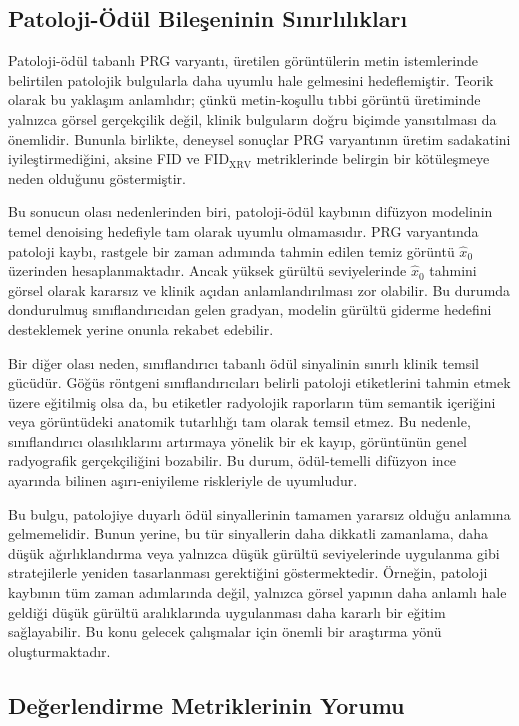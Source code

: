 \documentclass[11pt]{article}
\begin{document}
\subsection{Patoloji-Ödül Bileşeninin Sınırlılıkları}

Patoloji-ödül tabanlı PRG varyantı, üretilen görüntülerin metin istemlerinde
belirtilen patolojik bulgularla daha uyumlu hale gelmesini hedeflemiştir.
Teorik olarak bu yaklaşım anlamlıdır; çünkü metin-koşullu tıbbi görüntü
üretiminde yalnızca görsel gerçekçilik değil, klinik bulguların doğru biçimde
yansıtılması da önemlidir. Bununla birlikte, deneysel sonuçlar PRG varyantının
üretim sadakatini iyileştirmediğini, aksine FID ve FID$_{\text{XRV}}$
metriklerinde belirgin bir kötüleşmeye neden olduğunu göstermiştir.

Bu sonucun olası nedenlerinden biri, patoloji-ödül kaybının difüzyon modelinin
temel denoising hedefiyle tam olarak uyumlu olmamasıdır. PRG varyantında
patoloji kaybı, rastgele bir zaman adımında tahmin edilen temiz görüntü
$\hat{x}_0$ üzerinden hesaplanmaktadır. Ancak yüksek gürültü seviyelerinde
$\hat{x}_0$ tahmini görsel olarak kararsız ve klinik açıdan anlamlandırılması
zor olabilir. Bu durumda dondurulmuş sınıflandırıcıdan gelen gradyan, modelin
gürültü giderme hedefini desteklemek yerine onunla rekabet edebilir.

Bir diğer olası neden, sınıflandırıcı tabanlı ödül sinyalinin sınırlı klinik
temsil gücüdür. Göğüs röntgeni sınıflandırıcıları belirli patoloji etiketlerini
tahmin etmek üzere eğitilmiş olsa da, bu etiketler radyolojik raporların tüm
semantik içeriğini veya görüntüdeki anatomik tutarlılığı tam olarak temsil
etmez. Bu nedenle, sınıflandırıcı olasılıklarını artırmaya yönelik bir ek kayıp,
görüntünün genel radyografik gerçekçiliğini bozabilir. Bu durum, ödül-temelli
difüzyon ince ayarında bilinen aşırı-eniyileme riskleriyle de uyumludur.

Bu bulgu, patolojiye duyarlı ödül sinyallerinin tamamen yararsız olduğu
anlamına gelmemelidir. Bunun yerine, bu tür sinyallerin daha dikkatli
zamanlama, daha düşük ağırlıklandırma veya yalnızca düşük gürültü seviyelerinde
uygulanma gibi stratejilerle yeniden tasarlanması gerektiğini göstermektedir.
Örneğin, patoloji kaybının tüm zaman adımlarında değil, yalnızca görsel yapının
daha anlamlı hale geldiği düşük gürültü aralıklarında uygulanması daha kararlı
bir eğitim sağlayabilir. Bu konu gelecek çalışmalar için önemli bir araştırma
yönü oluşturmaktadır.

\subsection{Değerlendirme Metriklerinin Yorumu}
\end{document}
